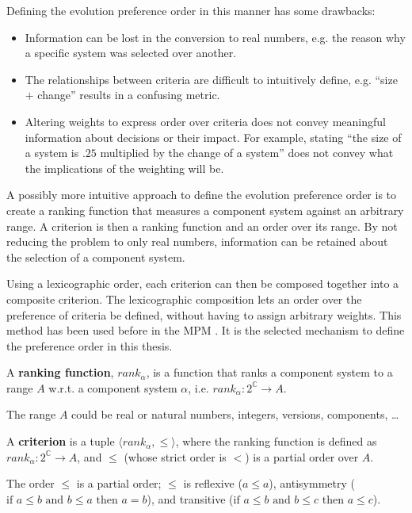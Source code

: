 Defining the evolution preference order in this manner has some drawbacks:
\begin{itemize}
  \item Information can be lost in the conversion to real numbers, e.g. the reason why a specific system was selected over another.
  \item The relationships between criteria are difficult to intuitively define, e.g. ``size $+$ change'' results in a confusing metric.
  \item Altering weights to express order over criteria does not convey meaningful information about decisions or their impact.
  For example, stating ``the size of a system is $.25$ multiplied by the change of a system'' does not convey what the implications of the weighting will be.
\end{itemize}

A possibly more intuitive approach to define the evolution preference order is to create a ranking function that measures a component system against an arbitrary range.
A criterion is then a ranking function and an order over its range. 
By not reducing the problem to only real numbers, information can be retained about the selection of a component system.

Using a lexicographic order, each criterion can then be composed together into a composite criterion.
The lexicographic composition lets an order over the preference of criteria be defined, without having to assign arbitrary weights.
This method has been used before in the MPM \citep{abate2011}.
It is the selected mechanism to define the preference order in this thesis.

\begin{defs}
A \textbf{ranking function}, $rank_{\alpha}$, is a function that ranks a component system to a range $A$ w.r.t. a component system $\alpha$, i.e. $rank_{\alpha} : 2^{\mathbb{C}} \rightarrow A$.
\end{defs}
The range $A$ could be real or natural numbers, integers, versions, components, \ldots

\begin{defs}
\label{formal.defcriteria}
A \textbf{criterion} is a tuple $\langle rank_{\alpha}, \leq \rangle$, 
where the ranking function is defined as $rank_{\alpha} : 2^{\mathbb{C}} \rightarrow A$, and $\leq$ (whose strict order is $<$) is a partial order over $A$.
\end{defs}
The order $\leq$ is a partial order; $\leq$ is reflexive ($a \leq a$), antisymmetry ($\text{if } a \leq b \text{ and } b \leq a \text{ then } a = b$), and transitive ($ \text{if } a \leq b  \text{ and } b \leq c  \text{ then } a \leq c$).

